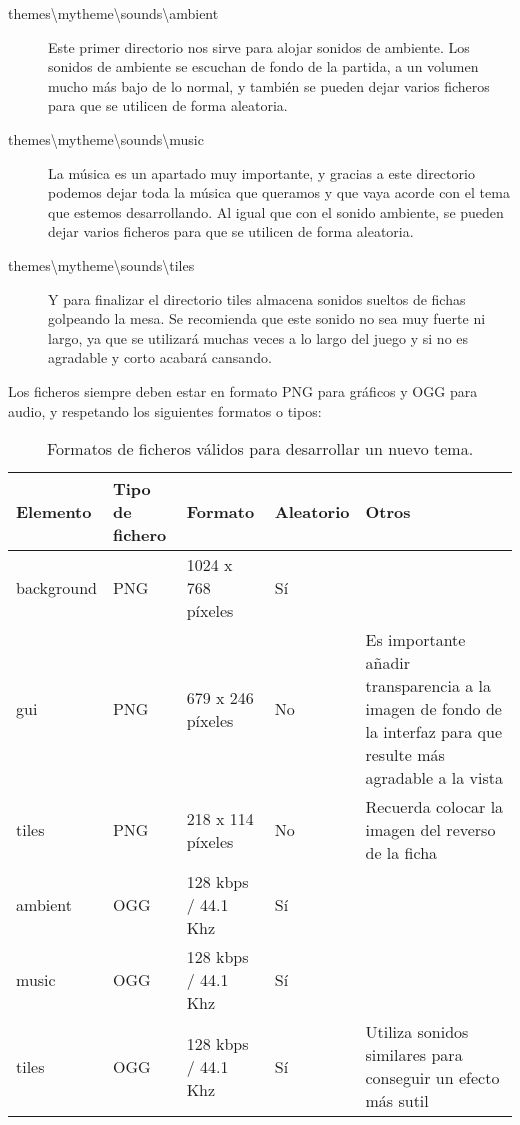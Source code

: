 \begin{description}
                \item[themes\textbackslash{}mytheme\textbackslash{}sounds\textbackslash{}ambient] Este primer directorio nos sirve para alojar sonidos de ambiente. Los sonidos de ambiente
                    se escuchan de fondo de la partida, a un volumen mucho más bajo de lo normal, y también se pueden
                    dejar varios ficheros para que se utilicen de forma aleatoria.
                \item[themes\textbackslash{}mytheme\textbackslash{}sounds\textbackslash{}music] La música es un apartado muy importante, y gracias a este directorio podemos dejar toda
                    la música que queramos y que vaya acorde con el tema que estemos desarrollando. Al igual que con el
                    sonido ambiente, se pueden dejar varios ficheros para que se utilicen de forma aleatoria.
                \item[themes\textbackslash{}mytheme\textbackslash{}sounds\textbackslash{}tiles] Y para finalizar el directorio tiles almacena sonidos sueltos de fichas golpeando la mesa.
                    Se recomienda que este sonido no sea muy fuerte ni largo, ya que se utilizará muchas veces a lo largo
                    del juego y si no es agradable y corto acabará cansando.
\end{description}

Los ficheros siempre deben estar en formato PNG para gráficos y OGG para audio, y respetando los siguientes formatos o tipos:

\begin{center}
    \begin{table}[h]
    \begin{tabular}{ | l | l | l | l | p{5cm} |}
    \hline
    Elemento & Tipo de fichero & Formato & Aleatorio & Otros \\ \hline
    background & PNG & 1024 x 768 píxeles & Sí &  \\ \hline
    gui & PNG & 679 x 246 píxeles & No & Es importante añadir transparencia a la imagen de fondo de la interfaz 
    para que resulte más agradable a la vista \\ \hline
    tiles & PNG & 218 x 114 píxeles & No & Recuerda colocar la imagen del reverso de la ficha \\ \hline
    ambient & OGG & 128 kbps / 44.1 Khz & Sí &  \\ \hline
    music & OGG & 128 kbps / 44.1 Khz & Sí &  \\ \hline
    tiles & OGG & 128 kbps / 44.1 Khz & Sí & Utiliza sonidos similares para conseguir un efecto más sutil \\ \hline
    \hline
    \end{tabular}
    \caption{Formatos de ficheros válidos para desarrollar un nuevo tema.}
    \end{table}
\end{center}


